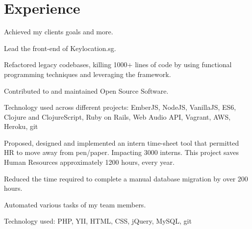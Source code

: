 \documentclass[letterpaper]{deedy-resume} %
\begin{document}
\begin{minipage}[t]{0.66\textwidth} %


\section{Experience}



\vspace{\topsep} %
\begin{tightitemize}
    \item Achieved my clients goals and more.
    \item Lead the front-end of Keylocation.sg.
    \item Refactored legacy codebases, killing 1000+ lines of code by using functional programming techniques and leveraging the framework.
    \item Contributed to and maintained Open Source Software.
    \item Technology used across different projects: EmberJS, NodeJS, VanillaJS, ES6, Clojure and ClojureScript, Ruby on Rails, Web Audio API, Vagrant, AWS, Heroku, git
\end{tightitemize}

\sectionspace %


\begin{tightitemize}
\item Proposed, designed and implemented an intern time-sheet tool that
  permitted HR to move away from pen/paper. Impacting 3000 interns.
  This project saves Human Resources approximately 1200 hours, every year.
\item Reduced the time required to complete a manual database
  migration by over 200 hours.
\item Automated various tasks of my team members.
\item Technology used: PHP, YII, HTML, CSS, jQuery, MySQL, git
\end{tightitemize}


\end{minipage}
\end{document}
